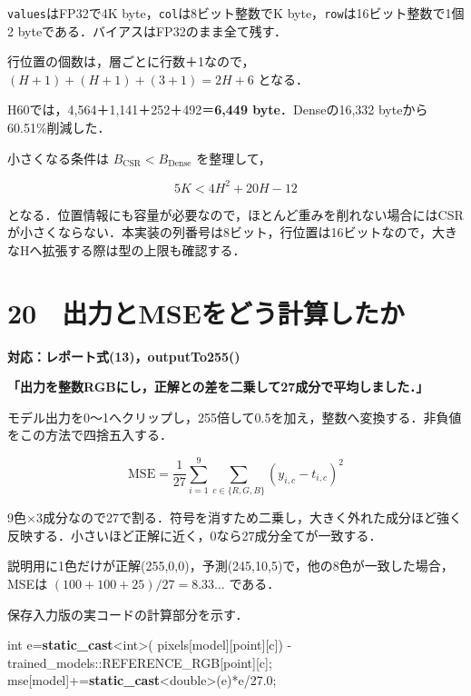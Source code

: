 \documentclass[
  14pt,
  a5paper,
]{extarticle}
\newenvironment{Shaded}{}{}
\newcommand{\DataTypeTok}[1]{\textcolor[rgb]{0.56,0.13,0.00}{#1}}
\newcommand{\FloatTok}[1]{\textcolor[rgb]{0.25,0.63,0.44}{#1}}
\newcommand{\KeywordTok}[1]{\textcolor[rgb]{0.00,0.44,0.13}{\textbf{#1}}}
\newcommand{\NormalTok}[1]{#1}
\newcommand{\OperatorTok}[1]{\textcolor[rgb]{0.40,0.40,0.40}{#1}}
\begin{document}
\texttt{values}はFP32で4K byte，\texttt{col}は8ビット整数でK
byte，\texttt{row}は16ビット整数で1個2
byteである．バイアスはFP32のまま全て残す．

行位置の個数は，層ごとに行数＋1なので，\((H+1)+(H+1)+(3+1)=2H+6\)
となる．

H60では，4,564＋1,141＋252＋492＝\textbf{6,449 byte}．Denseの16,332
byteから60.51\%削減した．

小さくなる条件は \(B_{\mathrm{CSR}}<B_{\mathrm{Dense}}\) を整理して，

\[5K<4H^2+20H-12\]

となる．位置情報にも容量が必要なので，ほとんど重みを削れない場合にはCSRが小さくならない．本実装の列番号は8ビット，行位置は16ビットなので，大きなHへ拡張する際は型の上限も確認する．

\newpage

\section{20　出力とMSEをどう計算したか}\label{ux51faux529bux3068mseux3092ux3069ux3046ux8a08ux7b97ux3057ux305fux304b}

\textbf{対応：レポート式(13)，outputTo255()}

\textbf{「出力を整数RGBにし，正解との差を二乗して27成分で平均しました．」}

モデル出力を0〜1へクリップし，255倍して0.5を加え，整数へ変換する．非負値をこの方法で四捨五入する．

\[\mathrm{MSE}=\frac1{27}
\sum_{i=1}^{9}\sum_{c\in\{R,G,B\}}(y_{i,c}-t_{i,c})^2\]

9色×3成分なので27で割る．符号を消すため二乗し，大きく外れた成分ほど強く反映する．小さいほど正解に近く，0なら27成分全てが一致する．

説明用に1色だけが正解(255,0,0)，予測(245,10,5)で，他の8色が一致した場合，MSEは
\((100+100+25)/27=8.33\ldots\) である．

保存入力版の実コードの計算部分を示す．

\begin{Shaded}
\begin{Highlighting}[]
\DataTypeTok{int}\NormalTok{ e}\OperatorTok{=}\KeywordTok{static\_cast}\OperatorTok{\textless{}}\DataTypeTok{int}\OperatorTok{\textgreater{}(}
\NormalTok{  pixels}\OperatorTok{[}\NormalTok{model}\OperatorTok{][}\NormalTok{point}\OperatorTok{][}\NormalTok{c}\OperatorTok{])}
  \OperatorTok{{-}}\NormalTok{trained\_models}\OperatorTok{::}\NormalTok{REFERENCE\_RGB}\OperatorTok{[}\NormalTok{point}\OperatorTok{][}\NormalTok{c}\OperatorTok{];}
\NormalTok{mse}\OperatorTok{[}\NormalTok{model}\OperatorTok{]+=}\KeywordTok{static\_cast}\OperatorTok{\textless{}}\DataTypeTok{double}\OperatorTok{\textgreater{}(}\NormalTok{e}\OperatorTok{)*}\NormalTok{e}\OperatorTok{/}\FloatTok{27.0}\OperatorTok{;}
\end{Highlighting}
\end{Shaded}
\end{document}
